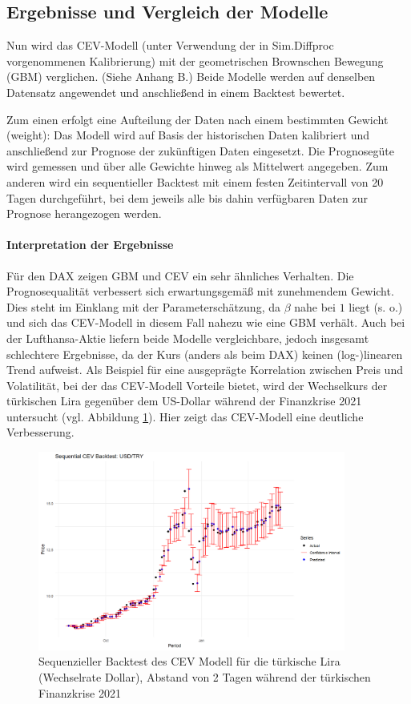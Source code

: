 \subsection{Ergebnisse und Vergleich der Modelle}

Nun wird das CEV-Modell (unter Verwendung der in Sim.Diffproc vorgenommenen Kalibrierung) mit der geometrischen Brownschen Bewegung (GBM) verglichen. (Siehe Anhang B.) Beide Modelle werden auf denselben Datensatz angewendet und anschließend in einem Backtest bewertet.

Zum einen erfolgt eine Aufteilung der Daten nach einem bestimmten Gewicht (weight): Das Modell wird auf Basis der 
historischen Daten kalibriert und anschließend zur Prognose der zukünftigen Daten eingesetzt. Die Prognosegüte 
wird gemessen und über alle Gewichte hinweg als Mittelwert angegeben.
Zum anderen wird ein sequentieller Backtest mit einem festen Zeitintervall von 20 Tagen durchgeführt, bei dem jeweils 
alle bis dahin verfügbaren Daten zur Prognose herangezogen werden.


\paragraph{Interpretation der Ergebnisse}
Für den DAX zeigen GBM und CEV ein sehr ähnliches Verhalten. Die Prognosequalität verbessert sich erwartungsgemäß 
mit zunehmendem Gewicht. Dies steht im Einklang mit der Parameterschätzung, da $\beta$ nahe bei $1$ liegt (s. o.) und 
sich das CEV-Modell in diesem Fall nahezu wie eine GBM verhält.
Auch bei der Lufthansa-Aktie liefern beide Modelle vergleichbare, jedoch insgesamt schlechtere Ergebnisse, da der 
Kurs (anders als beim DAX) keinen (log-)linearen Trend aufweist.
Als Beispiel für eine ausgeprägte Korrelation zwischen Preis und Volatilität, bei der das CEV-Modell 
Vorteile bietet, wird der Wechselkurs der türkischen Lira gegenüber dem US-Dollar während der Finanzkrise 2021 untersucht (vgl. Abbildung \ref{fig:cev_try}). Hier zeigt das CEV-Modell eine deutliche Verbesserung.

\begin{figure}[H]
    \centering
    \includegraphics[width=0.9\textwidth]{images/cev_try.png}
    \caption{Sequenzieller Backtest des CEV Modell für die türkische Lira (Wechselrate Dollar), Abstand von 2 Tagen während der türkischen Finanzkrise 2021}
    \label{fig:cev_try}
\end{figure}